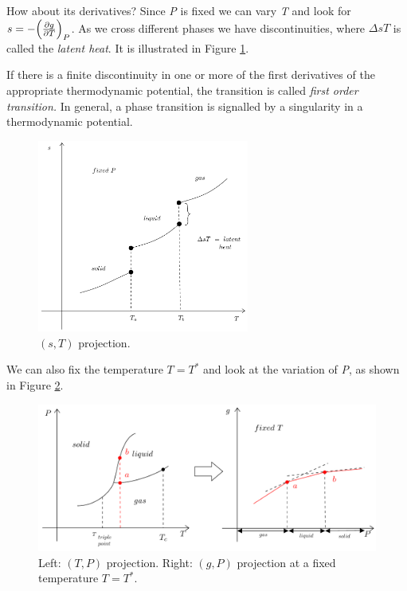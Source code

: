 \documentclass[../main/main.tex]{subfiles}
\begin{document}
\noindent
How about its derivatives? Since \emph{P}  is fixed we can vary \emph{T}  and look for \( s=-\qty(\pdv{g}{T} )_P  \). As we cross different phases  we have discontinuities, where \( \Delta s T \)  is called the \emph{latent heat}. It is illustrated in Figure \ref{fig:2_4}.

If there is a finite discontinuity in one or more of the first derivatives of the appropriate thermodynamic potential, the transition is called \emph{first order transition.} In general, a phase transition is signalled by a singularity in a thermodynamic potential.


\begin{figure}[h!]
\centering
\includegraphics[width=0.62\textwidth]{../lessons/2_image/4.pdf}
\caption{\label{fig:2_4} \( (s,T) \) projection. }
\end{figure}


We can also fix the temperature \( T=T^* \)  and look at the variation of \emph{P}, as shown in Figure \ref{fig:2_5}.

\begin{figure}[h!]
\centering
\includegraphics[width=1\textwidth]{../lessons/2_image/5.pdf}
\caption{\label{fig:2_5} Left: \( (T,P) \) projection. Right:  \( (g,P) \) projection at a fixed temperature \( T = T^* \).}
\end{figure}
\end{document}
